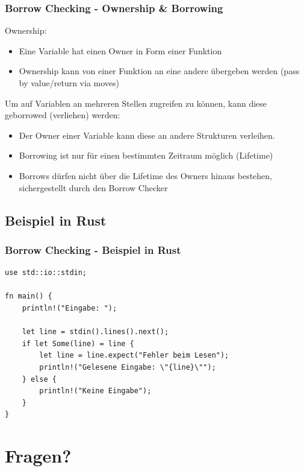 \documentclass{beamer}
\begin{document}
        \begin{frame}
            \frametitle{Borrow Checking - Ownership \& Borrowing}
            Ownership:
            \begin{itemize}
                \item Eine Variable hat einen Owner in Form einer Funktion
                \item Ownership kann von einer Funktion an eine andere übergeben werden (pass by value/return via moves)
            \end{itemize}
            Um auf Variablen an mehreren Stellen zugreifen zu können, kann diese geborrowed (verliehen) werden:
            \begin{itemize}
                \item Der Owner einer Variable kann diese an andere Strukturen verleihen.
                \item Borrowing ist nur für einen bestimmten Zeitraum möglich (Lifetime)
                \item Borrows dürfen nicht über die Lifetime des Owners hinaus bestehen, sichergestellt durch den Borrow Checker
            \end{itemize}
        \end{frame}

        \subsection{Beispiel in Rust}
        \begin{frame}[fragile]
            \frametitle{Borrow Checking - Beispiel in Rust}

            \begin{verbatim}
use std::io::stdin;

fn main() {
    println!("Eingabe: ");

    let line = stdin().lines().next();
    if let Some(line) = line {
        let line = line.expect("Fehler beim Lesen");
        println!("Gelesene Eingabe: \"{line}\"");
    } else {
        println!("Keine Eingabe");
    }
}
            \end{verbatim}
        \end{frame}

    \section{Fragen?}
\end{document}
